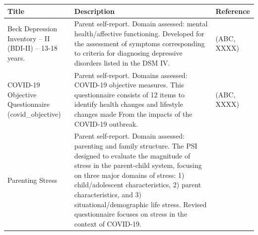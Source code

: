 \documentclass[]{book}
\begin{document}
\begin{longtable}[]{@{}lll@{}}
\toprule
\begin{minipage}[b]{0.32\columnwidth}\raggedright
Title\strut
\end{minipage} & \begin{minipage}[b]{0.32\columnwidth}\raggedright
Description\strut
\end{minipage} & \begin{minipage}[b]{0.27\columnwidth}\raggedright
Reference\strut
\end{minipage}\tabularnewline
\midrule
\endhead
\begin{minipage}[t]{0.32\columnwidth}\raggedright
Beck Depression Inventory -- II (BDI-II) -- 13-18 years.\strut
\end{minipage} & \begin{minipage}[t]{0.32\columnwidth}\raggedright
Parent self-report. Domain assessed: mental health/affective functioning. Developed for the assessment of symptoms corresponding to criteria for diagnosing depressive disorders listed in the DSM IV.\strut
\end{minipage} & \begin{minipage}[t]{0.27\columnwidth}\raggedright
(ABC, XXXX)\strut
\end{minipage}\tabularnewline
\begin{minipage}[t]{0.32\columnwidth}\raggedright
COVID-19 Objective Questionnaire (covid\_objective)\strut
\end{minipage} & \begin{minipage}[t]{0.32\columnwidth}\raggedright
Parent self-report. Domains assessed: COVID-19 objective measures. This questionnaire consists of 12 items to identify health changes and lifestyle changes made From the impacts of the COVID-19 outbreak.\strut
\end{minipage} & \begin{minipage}[t]{0.27\columnwidth}\raggedright
(ABC, XXXX)\strut
\end{minipage}\tabularnewline
\begin{minipage}[t]{0.32\columnwidth}\raggedright
Parenting Stress\strut
\end{minipage} & \begin{minipage}[t]{0.32\columnwidth}\raggedright
Parent self-report. Domain assessed: parenting and family structure. The PSI designed to evaluate the magnitude of stress in the parent-child system, focusing on three major domains of stress: 1) child/adolescent characteristics, 2) parent characteristics, and 3) situational/demographic life stress. Revised questionnaire focuses on stress in the context of COVID-19.\strut

\end{minipage}
\end{longtable}
\end{document}
